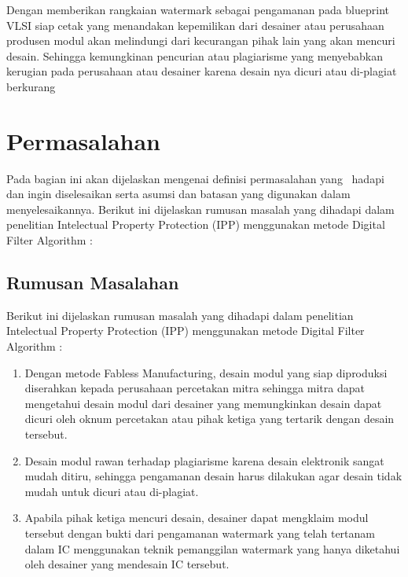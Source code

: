 Dengan memberikan rangkaian watermark sebagai pengamanan pada blueprint VLSI siap cetak yang menandakan kepemilikan dari desainer atau perusahaan produsen modul akan melindungi dari kecurangan pihak lain yang akan mencuri desain. Sehingga kemungkinan pencurian atau plagiarisme yang menyebabkan kerugian pada perusahaan atau desainer karena desain nya dicuri atau di-plagiat berkurang

% 

\section{Permasalahan}
Pada bagian ini akan dijelaskan mengenai definisi permasalahan yang \saya~hadapi dan ingin diselesaikan serta asumsi dan batasan yang digunakan dalam menyelesaikannya. Berikut ini dijelaskan rumusan masalah yang dihadapi dalam penelitian Intelectual Property Protection (IPP) menggunakan metode Digital Filter Algorithm :


\subsection{Rumusan Masalahan}
Berikut ini dijelaskan rumusan masalah yang dihadapi dalam penelitian Intelectual Property Protection (IPP) menggunakan metode Digital Filter Algorithm :

\begin{enumerate}
	\item Dengan metode Fabless Manufacturing, desain modul yang siap diproduksi diserahkan kepada perusahaan percetakan mitra sehingga mitra dapat mengetahui desain modul dari desainer yang	memungkinkan desain dapat dicuri oleh oknum percetakan atau pihak	ketiga yang tertarik dengan desain tersebut.
	
	\item Desain modul rawan terhadap plagiarisme karena desain elektronik sangat mudah ditiru, sehingga pengamanan desain harus dilakukan agar desain tidak mudah untuk dicuri atau di-plagiat.
	
	\item Apabila pihak ketiga mencuri desain, desainer dapat mengklaim modul tersebut dengan bukti dari pengamanan watermark yang telah tertanam dalam IC menggunakan teknik pemanggilan watermark yang hanya diketahui oleh desainer yang mendesain IC tersebut.
\end{enumerate}


